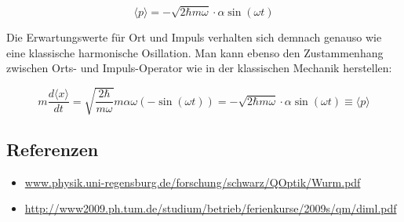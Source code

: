 \begin{equation}
  \label{eq:7}
\langle p \rangle = -\sqrt{ 2\hbar m\omega}\cdot  \alpha \sin (\omega t)
\end{equation}

Die Erwartungswerte für Ort und Impuls verhalten sich demnach genauso wie eine klassische harmonische Osillation. Man kann ebenso den Zustammenhang zwischen Orts- und Impuls-Operator wie in der klassischen Mechanik herstellen:


\begin{equation}
  \label{eq:8}
  m\frac{d\langle x\rangle }{dt} = \sqrt{\frac{2\hbar}{m\omega}} m\alpha \omega(-\sin(\omega t)) = - \sqrt{2\hbar m\omega}\cdot\alpha \sin(\omega t) \equiv \langle p \rangle 
\end{equation}


\subsection*{Referenzen}

\begin{itemize}
\item \url{www.physik.uni-regensburg.de/forschung/schwarz/QOptik/Wurm.pdf}
\item \url{http://www2009.ph.tum.de/studium/betrieb/ferienkurse/2009s/qm/diml.pdf}
\end{itemize}



